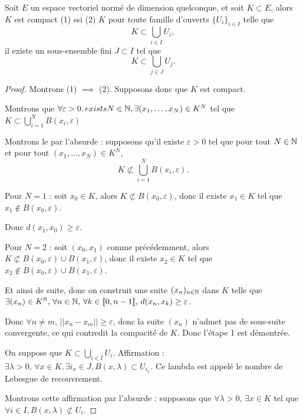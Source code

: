 \begin{theoreme}{}{}
    Soit $E$ un espace vectoriel normé de dimension quelconque, et soit $K \subset E$, alors 
    $K$ est compact (1) ssi (2) $K$ pour toute famille d'ouverts $\{U_i\}_{i \in I}$ telle que
    \[
        K \subset \bigcup_{i \in I} U_i,
    \]
    il existe un sous-ensemble fini $J \subset I$ tel que 
    \[
        K \subset \bigcup_{j \in J} U_j.
    \]

\end{theoreme}

\begin{proof}
    Montrons (1) $\implies$ (2). Supposons donc que $K$ est compact. 

     Montrons que $\forall \varepsilon > 0, exists N \in \mathbb{N}, \exists (x_1, \ldots, x_N) \in K^N$ tel que
    $\displaystyle K \subset \bigcup_{i=1}^N B(x_i, \varepsilon)$

    Montrons le par l'absurde : supposons qu'il existe $\varepsilon > 0$ tel que pour tout $N \in \mathbb{N}$ et pour tout $(x_1, \ldots, x_N) \in K^N$,
    \[
        K \not\subset \bigcup_{i=1}^N B(x_i, \varepsilon).
    \]

    Pour $N = 1$ : soit $x_0 \in K$, alors $K \not\subset B(x_0, \varepsilon)$, donc il existe $x_1 \in K$ tel que $x_1 \notin B(x_0, \varepsilon)$.

    Donc $d(x_1, x_0) \geq \varepsilon$.

    Pour $N = 2$ : soit $(x_0, x_1)$ comme précédemment, alors $K \not\subset B(x_0, \varepsilon) \cup B(x_1, \varepsilon)$, donc
    il existe $x_2 \in K$ tel que $x_2 \notin B(x_0, \varepsilon) \cup B(x_1, \varepsilon)$.

    Et ainsi de suite, donc on construit une suite $(x_n)_{n \in \mathbb{N}}$ dans $K$ telle que
    $\exists (x_n) \in K^{\mathbb{N}}, \, \forall n \in \mathbb{N}, \, \forall k \in [\![0, n - 1]\!], \, d(x_n, x_k) \geq \varepsilon$.

    Donc $\forall n \neq m, \, ||x_n - x_m|| \geq \varepsilon$, donc la suite $(x_n)$ n'admet pas de sous-suite convergente, ce qui contredit la compacité de $K$.
    Donc l'étape 1 est démontrée.

     On suppose que $K \subset \bigcup_{i \in I} U_i$. 
    Affirmation : $\exists \lambda > 0, \, \forall x \in K, \exists i_x \in J, B(x, \lambda) \subset U_{i_x}$. 
    Ce lambda est appelé le nombre de Lebesgue de recouvrement.

    Montrons cette affirmation par l'absurde : supposons que $\forall \lambda > 0, \, \exists x \in K$ tel que $\forall i \in I, B(x, \lambda) \not\subset U_i$.


\end{proof}
